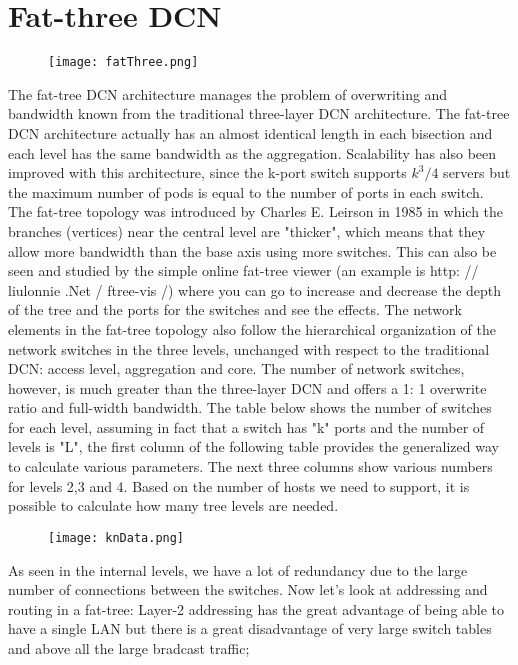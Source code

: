 \documentclass[]{article}
\begin{document}
\section{Fat-three DCN}
\begin{center}
\begin{figure}[htbp]
	\centering
	\texttt{[image: fatThree.png]}
\end{figure}
\end{center}
The fat-tree DCN architecture manages the problem of overwriting and bandwidth known from the traditional three-layer DCN architecture. The fat-tree DCN architecture actually has an almost identical length in each bisection and each level has the same bandwidth as the aggregation. Scalability has also been improved with this architecture, since the k-port switch supports  $k^{3}/4$ servers but the maximum number of pods is equal to the number of ports in each switch. The fat-tree topology was introduced by Charles E. Leirson in 1985 in which the branches (vertices) near the central level are "thicker", which means that they allow more bandwidth than the base axis using more switches. This can also be seen and studied by the simple online fat-tree viewer (an example is http: // liulonnie .Net / ftree-vis /) where you can go to increase and decrease the depth of the tree and the ports for the switches and see the effects. The network elements in the fat-tree topology also follow the hierarchical organization of the network switches in the three levels, unchanged with respect to the traditional DCN: access level, aggregation and core. The number of network switches, however, is much greater than the three-layer DCN and offers a 1: 1 overwrite ratio and full-width bandwidth. The table below shows the number of switches for each level, assuming in fact that a switch has "k" ports and the number of levels is "L", the first column of the following table provides the generalized way to calculate various parameters. The next three columns show various numbers for levels 2,3 and 4. Based on the number of hosts we need to support, it is possible to calculate how many tree levels are needed.
\begin{center}
\begin{figure}[htbp]
	\centering
	\texttt{[image: knData.png]}	
\end{figure}
\end{center}
As seen in the internal levels, we have a lot of redundancy due to the large number of connections between the switches. Now let's look at addressing and routing in a fat-tree: Layer-2 addressing has the great advantage of being able to have a single LAN but there is a great disadvantage of very large switch tables and above all the large bradcast traffic;
\end{document}
